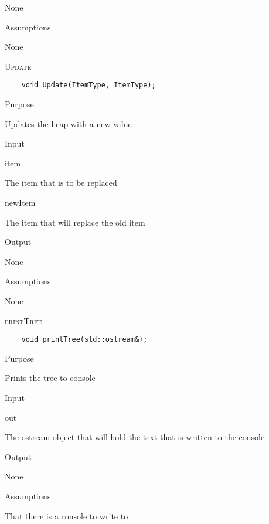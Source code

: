 \documentclass[pdftex, 12pt]{article}
\begin{document}
\begin{description}
\begin{description}
				None

			\item{Assumptions}

				None

		\end{description}
	\item{\textsc{Update}}
\begin{lstlisting}
	void Update(ItemType, ItemType);
\end{lstlisting}
		\begin{description}

			\item{Purpose}

				Updates the heap with a new value

			\item{Input}

				\begin{description}

					\item{item}

						The item that is to be replaced

					\item{newItem}

						The item that will replace the old item

				\end{description}

			\item{Output}

				None

			\item{Assumptions}

				None

		\end{description}
	\item{\textsc{printTree}}
\begin{lstlisting}
	void printTree(std::ostream&);
\end{lstlisting}
		\begin{description}

			\item{Purpose}

				Prints the tree to console

			\item{Input}

				\begin{description}

					\item{out}

						The ostream object that will hold the text that is written to the console

				\end{description}

			\item{Output}

				None

			\item{Assumptions}

				That there is a console to write to

		\end{description}
\end{description}
\end{document}
